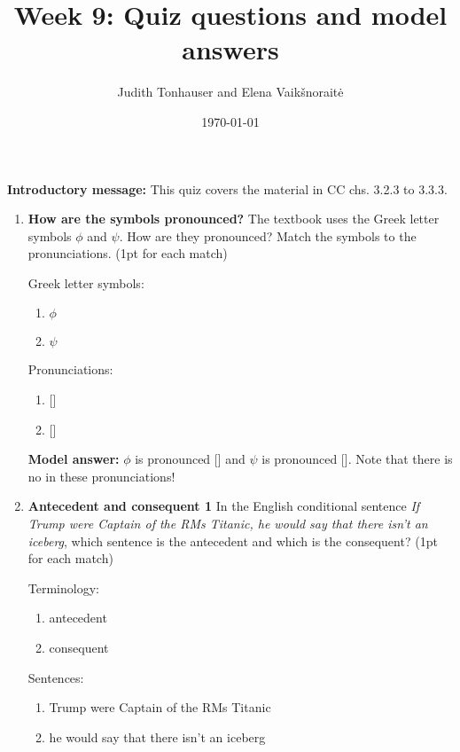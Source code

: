 \documentclass[a4,11pt]{article}
\title{Week 9: Quiz questions and model answers}
\author{Judith Tonhauser and Elena Vaik\v snorait\.{e} }
\date{\today}
\newcommand{\6}{\mbox{$[\hspace*{-.6mm}[$}}
\newcommand{\9}{\mbox{$]\hspace*{-.6mm}]$}}
\begin{document}
\maketitle

{\bf Introductory message:} This quiz covers the material in CC chs. 3.2.3 to 3.3.3.

\begin{enumerate}[leftmargin = 12pt]

\item {\bf How are the symbols pronounced?} The textbook uses the Greek letter symbols $\phi$ and $\psi$. How are they pronounced? Match the symbols to the pronunciations. (1pt for each match)

Greek letter symbols:

\begin{enumerate}
\item $\phi$
\item $\psi$
\end{enumerate}

Pronunciations:

\begin{enumerate}
\item {} []
\item {} []
\end{enumerate}

{\bf Model answer:} $\phi$ is pronounced [] and $\psi$ is pronounced []. Note that there is no  in these pronunciations!

\item {\bf  Antecedent and consequent 1} In the English conditional sentence {\em If Trump were Captain of the RMs Titanic, he would say that there isn't an iceberg}, which sentence is the antecedent and which is the consequent? (1pt for each match)

Terminology:

\begin{enumerate}
\item antecedent
\item consequent
\end{enumerate}

Sentences:

\begin{enumerate}
\item Trump were Captain of the RMs Titanic
\item he would say that there isn't an iceberg
\end{enumerate}


\end{enumerate}
\end{document}
